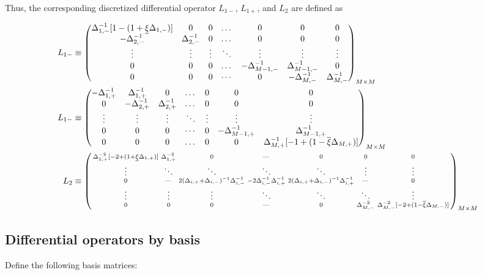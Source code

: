 \documentclass[11pt]{article}
\newenvironment{psmallmatrix}
{\left(\begin{smallmatrix}}
	{\end{smallmatrix}\right)}
\begin{document}
Thus, the corresponding discretized differential operator $L_{1-}$, $L_{1+}$, and $L_2$ are defined as 

\begin{align}
L_{1-} &\equiv \begin{pmatrix}
\Delta^{-1}_{1,-} [1 - (1 + \underline{\xi} \Delta_{1,-})] &0&0&\dots&0&0&0\\
-\Delta_{2,-}^{-1}&\Delta_{2,-}^{-1}&0&\dots&0&0&0\\
\vdots&\vdots&\vdots&\ddots&\vdots&\vdots&\vdots\\
0&0&0&\dots&-\Delta_{M-1,-}^{-1}&\Delta_{M-1,-}^{-1}&0\\
0&0&0&\cdots&0&-\Delta_{M,-}^{-1}&\Delta_{M,-}^{-1}
\end{pmatrix}_{M\times M}\label{eq:L-1} \\
L_{1-} &\equiv \begin{pmatrix}
-\Delta_{1,+}^{-1}&\Delta_{1,+}^{-1}&0&\dots&0&0&0\\
0&-\Delta_{2,+}^{-1}&\Delta_{2,+}^{-1}&\dots&0&0&0\\
\vdots&\vdots&\vdots&\ddots&\vdots&\vdots&\vdots\\
0&0&0&\cdots&0&-\Delta_{M-1,+}^{-1}&\Delta_{M-1,+}^{-1}\\
0&0&0&\dots&0&0&\Delta_{M,+}^{-1}  [-1 + (1 - \overline{\xi} \Delta_{M,+})]  \\
\end{pmatrix}_{M\times M}\label{eq:L-1-plus} \\
L_2 &\equiv \begin{psmallmatrix}
\Delta_{1,+}^{-2}[-2 + (1+\underline{\xi} \Delta_{1,+})] &\Delta_{1,+}^{-2}&0&\cdots&0&0&0 \\
\vdots&\ddots&\ddots&\ddots&\ddots&\vdots&\vdots\\
0&\cdots&2(\Delta_{i,+}+\Delta_{i,-})^{-1} \Delta_{i,-}^{-1} &-2\Delta_{i,-}^{-1} \Delta_{i,+}^{-1}  & 2 (\Delta_{i,+}+\Delta_{i,-})^{-1} \Delta_{i,+}^{-1}&\cdots&0 \\
\vdots&\vdots&\vdots&\ddots&\ddots&\ddots&\vdots\\
0&0&0&\cdots&0&\Delta_{M,-}^{-2}&\Delta_{M,-}^{-2} [-2 + (1- \overline{\xi}\Delta_{M,-})]
\end{psmallmatrix}_{M\times M}\label{eq:L-2}
\end{align}

\subsection{Differential operators by basis}
Define the following basis matrices:
\end{document}
